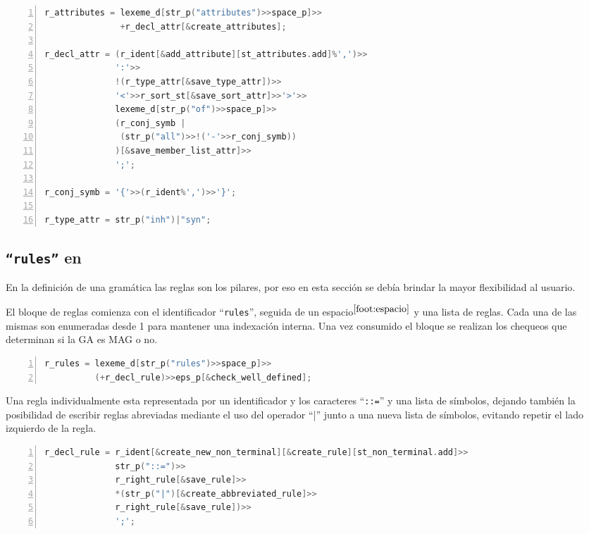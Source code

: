 \begin{lstlisting}[language=C++, basicstyle=\scriptsize, numbers=left, numbersep=5pt, numberstyle=\tiny]
r_attributes = lexeme_d[str_p("attributes")>>space_p]>>
               +r_decl_attr[&create_attributes];

r_decl_attr = (r_ident[&add_attribute][st_attributes.add]%',')>>
              ':'>>
              !(r_type_attr[&save_type_attr])>>
              '<'>>r_sort_st[&save_sort_attr]>>'>'>>
              lexeme_d[str_p("of")>>space_p]>>
              (r_conj_symb |
               (str_p("all")>>!('-'>>r_conj_symb))
              )[&save_member_list_attr]>>
              ';';

r_conj_symb = '{'>>(r_ident%',')>>'}';

r_type_attr = str_p("inh")|"syn";
\end{lstlisting}

\subsection{\texttt{``rules''} en \spirit}

En la definición de una gramática las reglas son los pilares, por eso en esta sección se debía brindar la mayor flexibilidad al usuario.

El bloque de reglas comienza con el identificador ``\texttt{rules}'', seguida de un espacio$^{\ref{foot:espacio}}$ y una lista de reglas. Cada una de las mismas son enumeradas desde 1 para mantener una indexación interna. Una vez consumido el bloque se realizan los chequeos que determinan si la GA es MAG o no.

\begin{lstlisting}[language=C++, basicstyle=\scriptsize, numbers=left, numbersep=5pt, numberstyle=\tiny]
r_rules = lexeme_d[str_p("rules")>>space_p]>>
          (+r_decl_rule)>>eps_p[&check_well_defined];
\end{lstlisting}

Una regla individualmente esta representada por un identificador y los caracteres ``\texttt{::=}'' y una lista de símbolos, dejando también la posibilidad de escribir reglas abreviadas mediante el uso del operador ``|'' junto a una nueva lista de símbolos, evitando repetir el lado izquierdo de la regla.

\begin{lstlisting}[language=C++, basicstyle=\scriptsize, numbers=left, numbersep=5pt, numberstyle=\tiny]
r_decl_rule = r_ident[&create_new_non_terminal][&create_rule][st_non_terminal.add]>>
              str_p("::=")>>
              r_right_rule[&save_rule]>>
              *(str_p("|")[&create_abbreviated_rule]>>
              r_right_rule[&save_rule])>>
              ';';
\end{lstlisting}

